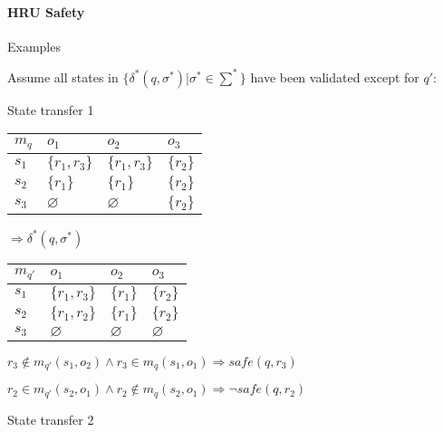 \documentclass[a4paper]{article}
\begin{document}
\begin{multicols}{3}
    \paragraph{HRU Safety}
    Examples
    \begin{itemize*}
        \item Assume all states in $\{\delta^*(q,\sigma^*)|\sigma^*\in\sum^*\}$ have been validated except for $q'$:
              \begin{itemize*}
                  \item State transfer 1
                        \begin{tabular}{l|l|l|l}
                            $m_q$ & $o_1$         & $o_2$         & $o_3$     \\\hline
                            $s_1$ & $\{r_1,r_3\}$ & $\{r_1,r_3\}$ & $\{r_2\}$ \\
                            $s_2$ & $\{r_1\}$     & $\{r_1\}$     & $\{r_2\}$ \\
                            $s_3$ & $\varnothing$ & $\varnothing$ & $\{r_2\}$
                        \end{tabular}
                        \begin{itemize*}
                            \item $\Rightarrow \delta^*(q,\sigma^*)$
                        \end{itemize*}
                        \begin{tabular}{l|l|l|l}
                            $m_{q'}$ & $o_1$         & $o_2$         & $o_3$         \\\hline
                            $s_1$    & $\{r_1,r_3\}$ & $\{r_1\}$     & $\{r_2\}$     \\
                            $s_2$    & $\{r_1,r_2\}$ & $\{r_1\}$     & $\{r_2\}$     \\
                            $s_3$    & $\varnothing$ & $\varnothing$ & $\varnothing$
                        \end{tabular}
                        \begin{itemize*}
                            \item $r_3\not\in m_{q'}(s_1,o_2)\wedge r_3\in m_q(s_1,o_1)\Rightarrow safe(q,r_3)$
                            \item $r_2\in m_{q'}(s_2,o_1)\wedge r_2 \not\in m_q(s_2,o_1)\Rightarrow\lnot safe(q,r_2)$
                        \end{itemize*}
                  \item State transfer 2

\end{itemize*}
\end{itemize*}
\end{multicols}
\end{document}
